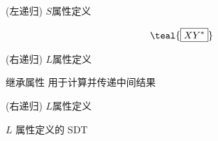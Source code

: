 \begin{frame}{}
  \begin{center}
    (左递归) $S$属性定义
    \vspace{-0.50cm}
    

    \vspace{-0.60cm}
    \[
      \teal{\boxed{X Y^{\ast}}}
    \]

    (右递归) $L$属性定义
    \vspace{-0.50cm}
    
  \end{center}
\end{frame}

\begin{frame}{}
  \begin{center}
    继承属性  用于计算并传递中间结果

    \vspace{0.50cm}

    \vspace{0.50cm}
  \end{center}
\end{frame}

\begin{frame}{}
  \begin{center}
    (右递归) $L$属性定义
    \vspace{-0.50cm}
    

    \vspace{0.30cm}

    \pause
    \vspace{0.50cm}
    $L$ 属性定义的 SDT
    \vspace{-0.50cm}
    
  \end{center}
\end{frame}

\begin{frame}{}
  \begin{center}
    

    
  \end{center}
\end{frame}

